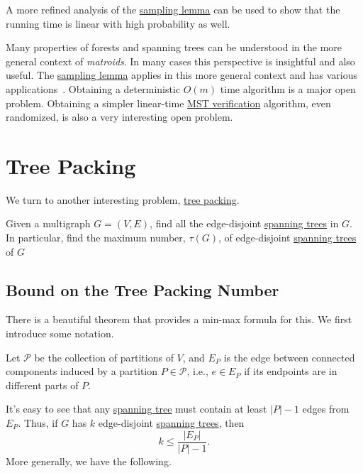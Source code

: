\begin{remark}
	A more refined analysis of the \hyperref[lma:sampling]{sampling lemma} can be used to show that the running time is linear with high probability as well.
\end{remark}

Many properties of forests and spanning trees can be understood in the more general context of \emph{matroids}. In many cases this perspective is insightful and also useful. The \hyperref[lma:sampling]{sampling lemma} applies in this more general context and has various applications~\cite{karger1995random,karger1998random}. Obtaining a deterministic \(O(m)\) time algorithm is a major open problem. Obtaining a simpler linear-time \hyperref[thm:MST-verification]{MST verification} algorithm, even randomized, is also a very interesting open problem.

\section{Tree Packing}
We turn to another interesting problem, \hyperref[prb:TP]{tree packing}.

\begin{problem}\label{prb:TP}
Given a multigraph \(G = (V, E)\), find all the edge-disjoint \hyperref[def:spanning-tree]{spanning trees} in \(G\). In particular, find the maximum number, \(\tau (G)\), of edge-disjoint \hyperref[def:spanning-tree]{spanning trees} of \(G\)
\end{problem}

\subsection{Bound on the Tree Packing Number}
There is a beautiful theorem that provides a min-max formula for this. We first introduce some notation.

\begin{notation}
	Let \(\mathcal{P} \) be the collection of partitions of \(V\), and \(E_P\) is the edge between connected components induced by a partition \(P \in \mathcal{P} \), i.e., \(e \in E_P\) if its endpoints are in different parts of \(P\).
\end{notation}

It's easy to see that any \hyperref[def:spanning-tree]{spanning tree} must contain at least \(\lvert P \rvert - 1\) edges from \(E_P\). Thus, if \(G\) has \(k\) edge-disjoint \hyperref[def:spanning-tree]{spanning trees}, then
\[
	k \leq \frac{\lvert E_P \rvert }{\lvert P \rvert - 1}.
\]
More generally, we have the following.

